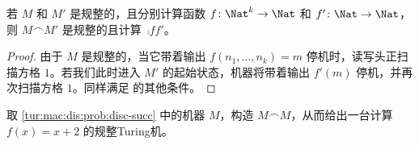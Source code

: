 \documentclass[../../../include/open-logic-section]{subfiles}
\begin{document}
\begin{prop}
    若 $M$ 和 $M'$ 是规整的，且分别计算函数 $f\colon
    \Nat^k \to \Nat$ 和 $f'\colon \Nat \to \Nat$，则 $M \frown M'$ 是规整的且计算~$\comp{f}{f'}$。
\end{prop}

\begin{proof}
    由于 $M$ 是规整的，当它带着输出 $f(n_1,\dots,n_k) = m$ 停机时，读写头正扫描方格 $1$。若我们此时进入 $M'$ 的起始状态，机器将带着输出 $f'(m)$ 停机，并再次扫描方格 $1$。同样满足  的其他条件。
\end{proof}

\begin{prob}
    取 \cref{tur:mac:dis:prob:disc-succ} 中的机器 $M$，构造 $M \frown M$，从而给出一台计算 $f(x) = x+2$ 的规整Turing机。
\end{prob}
\end{document}
